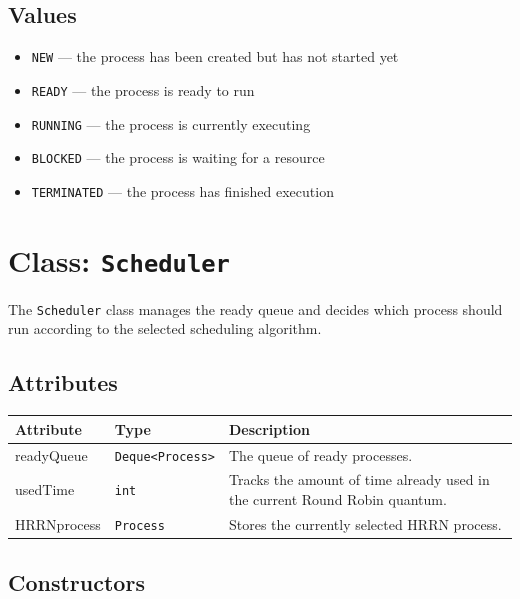 \documentclass[12pt,a4paper]{article}
\begin{document}
\subsection{Values}

\begin{itemize}[leftmargin=1.5em]
    \item \texttt{NEW} --- the process has been created but has not started yet
    \item \texttt{READY} --- the process is ready to run
    \item \texttt{RUNNING} --- the process is currently executing
    \item \texttt{BLOCKED} --- the process is waiting for a resource
    \item \texttt{TERMINATED} --- the process has finished execution
\end{itemize}

\section{Class: \texttt{Scheduler}}

\begin{purposebox}
The \texttt{Scheduler} class manages the ready queue and decides which process should run according to the selected scheduling algorithm.
\end{purposebox}

\subsection{Attributes}

\begin{tabularx}{\textwidth}{p{4cm} p{3cm} Y}
\toprule
\textbf{Attribute} & \textbf{Type} & \textbf{Description} \\
\midrule
readyQueue & \texttt{Deque<Process>} & The queue of ready processes. \\
usedTime & \texttt{int} & Tracks the amount of time already used in the current Round Robin quantum. \\
HRRNprocess & \texttt{Process} & Stores the currently selected HRRN process. \\
\bottomrule
\end{tabularx}

\subsection{Constructors}
\end{document}
